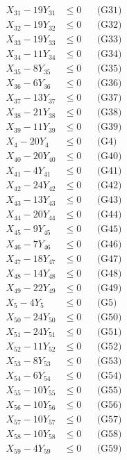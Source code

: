 \documentclass[a4paper,10pt]{article}
\begin{document}
{\begin{align}
X_{31} - 19Y_{31} &\leq 0 && \text{(G31)} \\
X_{32} - 19Y_{32} &\leq 0 && \text{(G32)} \\
X_{33} - 19Y_{33} &\leq 0 && \text{(G33)} \\
\allowbreak
X_{34} - 11Y_{34} &\leq 0 && \text{(G34)} \\
X_{35} - 8Y_{35} &\leq 0 && \text{(G35)} \\
X_{36} - 6Y_{36} &\leq 0 && \text{(G36)} \\
X_{37} - 13Y_{37} &\leq 0 && \text{(G37)} \\
X_{38} - 21Y_{38} &\leq 0 && \text{(G38)} \\
X_{39} - 11Y_{39} &\leq 0 && \text{(G39)} \\
X_{4} - 20Y_{4} &\leq 0 && \text{(G4)} \\
X_{40} - 20Y_{40} &\leq 0 && \text{(G40)} \\
X_{41} - 4Y_{41} &\leq 0 && \text{(G41)} \\
X_{42} - 24Y_{42} &\leq 0 && \text{(G42)} \\
X_{43} - 13Y_{43} &\leq 0 && \text{(G43)} \\
X_{44} - 20Y_{44} &\leq 0 && \text{(G44)} \\
X_{45} - 9Y_{45} &\leq 0 && \text{(G45)} \\
X_{46} - 7Y_{46} &\leq 0 && \text{(G46)} \\
X_{47} - 18Y_{47} &\leq 0 && \text{(G47)} \\
X_{48} - 14Y_{48} &\leq 0 && \text{(G48)} \\
X_{49} - 22Y_{49} &\leq 0 && \text{(G49)} \\
X_{5} - 4Y_{5} &\leq 0 && \text{(G5)} \\
X_{50} - 24Y_{50} &\leq 0 && \text{(G50)} \\
X_{51} - 24Y_{51} &\leq 0 && \text{(G51)} \\
\allowbreak
X_{52} - 11Y_{52} &\leq 0 && \text{(G52)} \\
X_{53} - 8Y_{53} &\leq 0 && \text{(G53)} \\
X_{54} - 6Y_{54} &\leq 0 && \text{(G54)} \\
X_{55} - 10Y_{55} &\leq 0 && \text{(G55)} \\
X_{56} - 10Y_{56} &\leq 0 && \text{(G56)} \\
X_{57} - 10Y_{57} &\leq 0 && \text{(G57)} \\
X_{58} - 10Y_{58} &\leq 0 && \text{(G58)} \\
X_{59} - 4Y_{59} &\leq 0 && \text{(G59)} \\

\end{align}}
\end{document}
